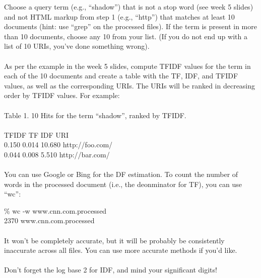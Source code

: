 Choose a query term (e.g., \enquote{shadow}) that is not a stop word
(see week 5 slides) and not HTML markup from step 1 (e.g., \enquote{http})
that matches at least 10 documents (hint: use \enquote{grep} on the processed
files).  If the term is present in more than 10 documents, choose
any 10 from your list.  (If you do not end up with a list of 10
URIs, you've done something wrong).\\
\\
As per the example in the week 5 slides, compute TFIDF values for
the term in each of the 10 documents and create a table with the
TF, IDF, and TFIDF values, as well as the corresponding URIs.  The
URIs will be ranked in decreasing order by TFIDF values.  For
example:\\
\\
Table 1. 10 Hits for the term \enquote{shadow}, ranked by TFIDF.\\
\\
TFIDF	TF		IDF	    URI\\
0.150	0.014	10.680	http://foo.com/\\
0.044	0.008	 5.510	http://bar.com/\\
\\
You can use Google or Bing for the DF estimation.  To count the
number of words in the processed document (i.e., the deonminator
for TF), you can use \enquote{wc}:

\% wc -w www.cnn.com.processed\\
    2370 www.cnn.com.processed\\
\\
It won't be completely accurate, but it will be probably be
consistently inaccurate across all files.  You can use more 
accurate methods if you'd like.\\
\\
Don't forget the log base 2 for IDF, and mind your significant
digits!